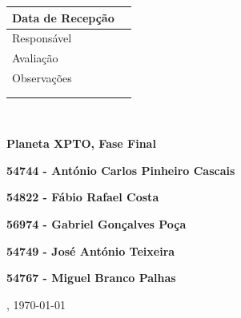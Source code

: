 \documentclass[12pt,a4paper,portuges]{style/myreport}
\newcommand{\TituloProjecto}{Planeta XPTO, Fase Final}
\newcommand{\PrimeiroElemento}{54744 - António Carlos Pinheiro Cascais}
\newcommand{\SegundoElemento}{54822 - Fábio Rafael Costa}
\newcommand{\TerceiroElemento}{56974 - Gabriel Gonçalves Poça}
\newcommand{\QuartoElemento}{54749 - José António Teixeira}
\newcommand{\QuintoElemento}{54767 - Miguel Branco Palhas}
\begin{document}
\newpage

\thispagestyle{empty}

\begin{flushright}
\begin{tabular}{|p{4cm}|p{4cm}|}
\hline
Data de Recepção & \\
\hline
Responsável & \\
\hline
Avaliação & \\
\hline
Observações & \\
& \\
& \\
\hline
\end{tabular}
\end{flushright}

~

\addvspace{8.4cm}

{\LARGE \textbf{ \TituloProjecto }}

\addvspace{2.5cm}

\textbf{\PrimeiroElemento}

\bigskip

\textbf{\SegundoElemento}

\bigskip

\textbf{\TerceiroElemento}

\bigskip

\textbf{\QuartoElemento}

\bigskip

\textbf{\QuintoElemento}

\addvspace{1.5cm}

{\large \monthname,  \dashdate\today}

\newpage






\tableofcontents
{}

\listoffigures
{}

\end{document}
